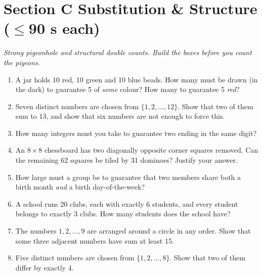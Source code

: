 \documentclass[11pt,a4paper]{article}
\begin{document}
\section*{Section C \quad Substitution \& Structure \hfill{\normalfont\small($\leq$90 s each)}}

\noindent\textit{Strong pigeonhole and structural double counts. Build the boxes before you count the pigeons.}

\begin{enumerate}

\item A jar holds 10 red, 10 green and 10 blue beads. How many must be drawn (in the dark) to guarantee 5 of \emph{some} colour? How many to guarantee 5 \emph{red}?

\item Seven distinct numbers are chosen from $\{1,2,\ldots,12\}$. Show that two of them sum to 13, and show that six numbers are not enough to force this.

\item How many integers must you take to guarantee two ending in the same digit?

\item An $8\times8$ chessboard has two diagonally opposite corner squares removed. Can the remaining 62 squares be tiled by 31 dominoes? Justify your answer.

\item How large must a group be to guarantee that two members share both a birth month \emph{and} a birth day-of-the-week?

\item A school runs 20 clubs, each with exactly 6 students, and every student belongs to exactly 3 clubs. How many students does the school have?

\item The numbers $1,2,\ldots,9$ are arranged around a circle in any order. Show that some three adjacent numbers have sum at least 15.

\item Five distinct numbers are chosen from $\{1,2,\ldots,8\}$. Show that two of them differ by exactly 4.

\end{enumerate}

\end{document}
